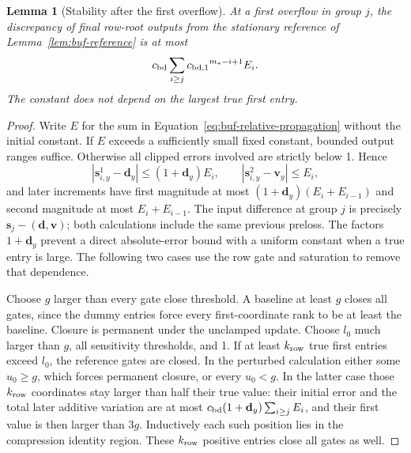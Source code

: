 \documentclass[11pt]{article}
\numberwithin{equation}{section}
\newtheorem{lemma}[theorem]{Lemma}
\theoremstyle{definition}
\theoremstyle{remark}
\begin{document}
\begin{lemma}[Stability after the first overflow]
\label{lem:buf-relative-stability}
At a first overflow in group $j$, the discrepancy of final row-root outputs
from the stationary reference of Lemma~\ref{lem:buf-reference} is at most
\begin{equation}
 {c_{\rm bd}}\sum_{i\geq j} {c_{\mathrm{bd},1}}^{m_*-i+1}{E_i}.
 \label{eq:buf-relative-propagation}
\end{equation}
The constant does not depend on the largest true first entry.
\end{lemma}
\begin{proof}
Write $E$ for the sum in Equation~\eqref{eq:buf-relative-propagation}
without the initial constant.  If $E$ exceeds a sufficiently small fixed
constant, bounded output ranges suffice.  Otherwise all clipped errors
involved are strictly below 1.  Hence
\[
 |{\mathbf{s}}^{1}_{i,y}-{\mathbf{d}}_y|\leq(1+{\mathbf{d}}_y){E_i},
 \qquad |{\mathbf{s}}^{2}_{i,y}-{\mathbf{v}}_y|\leq {E_i},
\]
and later increments have first magnitude at most
$(1+{\mathbf{d}}_y)({E_i}+{E_{i-1}})$ and second magnitude at most ${E_i}+{E_{i-1}}$.
The input difference at group $j$ is precisely ${\mathbf{s}}_j-({\mathbf{d}},{\mathbf{v}})$; both
calculations include the same previous preloss.
The factors $1+{\mathbf{d}}_y$ prevent a direct absolute-error bound with a uniform
constant when a true entry is large.  The following two cases use the
row gate and saturation to remove that dependence.

Choose ${g}$ larger than every gate close threshold.  A baseline at least
${g}$ closes all gates, since the dummy entries force every first-coordinate
rank to be at least the baseline.  Closure is permanent under the
unclamped update.  Choose ${l}_0$ much larger than ${g}$, all sensitivity
thresholds, and 1.  If at least ${k_{\rm row}}$ true first entries exceed ${l}_0$, the
reference gates are closed.  In the perturbed calculation either some
$u_0\geq {g}$, which forces permanent closure, or every $u_0<{g}$.
In the latter case those ${k_{\rm row}}$ coordinates stay larger than half their
true value: their initial error and the total later additive variation
are at most ${c_{\rm bd}}(1+{\mathbf{d}}_y)\sum_{i\geq j}{E_i}$, and their first value is then
larger than $3{g}$.  Inductively each such position lies in the compression
identity region.  These ${k_{\rm row}}$ positive entries close all gates as well.


\end{proof}
\end{document}

